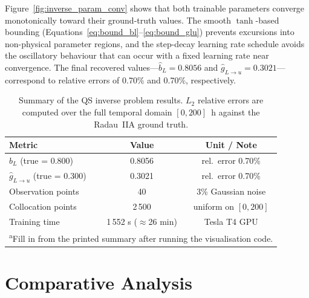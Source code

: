 \documentclass[14pt,a4paper,openany]{extbook}
\renewcommand{\footnotesize}{\fontsize{12}{14}\selectfont}
\begin{document}
Figure~\ref{fig:inverse_param_conv} shows that both trainable parameters converge
monotonically toward their ground-truth values.  The smooth $\tanh$-based bounding
(Equations~\ref{eq:bound_bl}--\ref{eq:bound_glu}) prevents excursions into
non-physical parameter regions, and the step-decay learning rate schedule avoids the
oscillatory behaviour that can occur with a fixed learning rate near convergence.
The final recovered values---$\hat{b}_L = 0.8056$ and
$\hat{g}_{L \to u} = 0.3021$---correspond to relative errors of 0.70\% and 0.70\%,
respectively.

\begin{table}[htb]
\centering
\caption[Inverse Problem: Summary of Results]{Summary of the QS inverse problem results.
$L_2$ relative errors are computed over the full temporal domain $[0, 200]$~h against
the Radau~IIA ground truth.}
\label{tab:qs_inverse_summary}
\begin{tabular}{lcc}
\hline
\textbf{Metric} & \textbf{Value} & \textbf{Unit / Note} \\ \hline
$\hat{b}_L$ (true = 0.800)    & 0.8056  & rel.\ error 0.70\% \\
$\hat{g}_{L \to u}$ (true = 0.300) & 0.3021 & rel.\ error 0.70\% \\[4pt]
Observation points             & 40      & 3\% Gaussian noise \\
Collocation points             & 2\,500  & uniform on $[0, 200]$ \\
Training time                  & 1\,552 s ($\approx$26 min) & Tesla T4 GPU \\
\hline
\multicolumn{3}{l}{\textsuperscript{a}\footnotesize Fill in from the printed summary
after running the visualisation code.}
\end{tabular}
\end{table}

\section{Comparative Analysis}
\label{sec:comparison}
\end{document}
